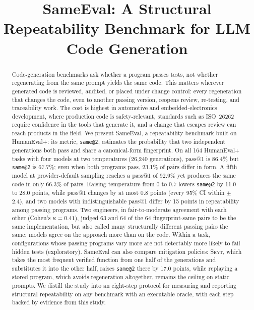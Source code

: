 \documentclass[acmsmall,screen,review,anonymous]{acmart}
\makeatletter
\newcommand{\skyt}{\textsc{Skyt}}
\newcommand{\sameeval}{SameEval}
\newcommand{\sameat}{\mbox{\texttt{same@2}}}
\makeatother
\begin{document}
\title[SameEval: Structural Repeatability of LLM Code]{SameEval: A Structural Repeatability Benchmark for LLM Code Generation}


\renewcommand{\shortauthors}{Anonymous Author(s)}
\renewcommand{\shorttitle}{SameEval: Structural Repeatability of LLM Code}

\begin{abstract}
Code-generation benchmarks ask whether a program passes tests, not whether
regenerating from the same prompt yields the same code.
This matters wherever generated code is reviewed, audited, or placed under
change control: every regeneration that changes the code, even to another
passing version, reopens review, re-testing, and traceability work.
The cost is highest in automotive and embedded-electronics development, where
production code is safety-relevant, standards such as ISO~26262 require
confidence in the tools that generate it, and a change that escapes review can
reach products in the field.
We present \sameeval{}, a repeatability benchmark built on HumanEval+: its
metric, \sameat{}, estimates the probability that two independent generations
both pass and share a canonical-form fingerprint.
On all 164 HumanEval+ tasks with four models at two temperatures
(26{,}240 generations), pass@1 is 86.4\% but \sameat{} is 67.7\%; even when
both programs pass, 23.1\% of pairs differ in form.
A fifth model at provider-default sampling reaches a pass@1 of 92.9\% yet
produces the same code in only 66.3\% of pairs.
Raising temperature from 0 to 0.7 lowers \sameat{} by 11.0 to 28.0 points,
while pass@1 changes by at most 0.8 points (every 95\% CI within $\pm$2.4), and
two models with indistinguishable pass@1 differ by 15 points in repeatability
among passing programs.
Two engineers, in fair-to-moderate agreement with each other (Cohen's
$\kappa{=}0.41$), judged 63 and 64 of the 64 fingerprint-same pairs to be the
same implementation, but also called many structurally different passing pairs
the same: models agree on the approach more than on the code.
Within a task, configurations whose passing programs vary more are not
detectably more likely to fail hidden tests (exploratory).
\sameeval{} can also compare mitigation policies: \skyt{}, which takes the
most frequent verified function from one half of the generations and
substitutes it into the other half, raises \sameat{} there by 17.0 points,
while replaying a stored program, which avoids regeneration altogether,
remains the ceiling on static prompts.
We distill the study into an eight-step protocol for measuring and reporting
structural repeatability on any benchmark with an executable oracle, with each
step backed by evidence from this study.
\end{abstract}
\end{document}

